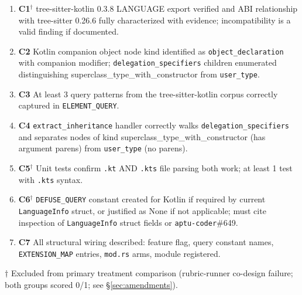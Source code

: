 \documentclass[11pt,a4paper]{article}
\begin{document}
\begin{enumerate}
  \item \textbf{C1}$^\dagger$ tree-sitter-kotlin 0.3.8 LANGUAGE export verified and ABI
        relationship with tree-sitter 0.26.6 fully characterized with evidence; incompatibility
        is a valid finding if documented.
  \item \textbf{C2} Kotlin companion object node kind identified as \texttt{object\_declaration}
        with companion modifier; \texttt{delegation\_specifiers} children enumerated
        distinguishing {\ttfamily superclass\_type\_\linebreak[0]with\_constructor} from
        \texttt{user\_type}.
  \item \textbf{C3} At least 3 query patterns from the tree-sitter-kotlin corpus correctly
        captured in \texttt{ELEMENT\_\linebreak[0]QUERY}.
  \item \textbf{C4} \texttt{extract\_inheritance} handler correctly walks
        \texttt{delegation\_specifiers} and separates nodes of kind
        {\ttfamily superclass\_type\_\linebreak[0]with\_constructor} (has argument parens)
        from \texttt{user\_type} (no parens).
  \item \textbf{C5}$^\dagger$ Unit tests confirm \texttt{.kt} AND \texttt{.kts} file parsing
        both work; at least 1 test with \texttt{.kts} syntax.
  \item \textbf{C6}$^\dagger$ \texttt{DEFUSE\_QUERY} constant created for Kotlin if required
        by current \texttt{LanguageInfo} struct, or justified as None if not applicable; must
        cite inspection of \texttt{LanguageInfo} struct fields or \texttt{aptu-coder}\#649.
  \item \textbf{C7} All structural wiring described: feature flag, query constant names,
        \texttt{EXTENSION\_MAP} entries, \texttt{mod.rs} arms, module registered.
\end{enumerate}

\noindent $\dagger$ Excluded from primary treatment comparison (rubric-runner co-design
failure; both groups scored 0/1; see \S\ref{sec:amendments}).
\end{document}
